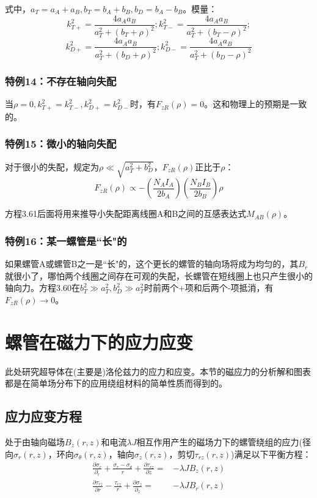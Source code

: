 式中，$a_T=a_A+a_B, b_T=b_A+b_B, b_D=b_A−b_B$。模量：
$$
k_{T+}^2=\frac{4a_Aa_B}{a_T^2+(b_T+\rho)^2}; k_{T-}^2=\frac{4a_Aa_B}{a_T^2+(b_T-\rho)^2};$$
$$k_{D+}^2=\frac{4a_Aa_B}{a_T^2+(b_D+\rho)^2};  k_{D-}^2=\frac{4a_Aa_B}{a_T^2+(b_D-\rho)^2}$$


\subsubsection{特例14：不存在轴向失配}
当$\rho=0, k_{T+}^2=k_{T-}^2, k_{D+}^2=k_{D-}^2$时，有$F_{zR}(\rho)=0$。这和物理上的预期是一致的。

\subsubsection{特例15：微小的轴向失配}
对于很小的失配，规定为$\rho\ll \sqrt{a_T^2+b_D^2}$，$F_{zR}(\rho)$正比于$\rho$：
\begin{equation}
F_{zR}(\rho)\propto-(\frac{N_AI_A}{2b_A})(\frac{N_BI_B}{2b_B})\rho
\end{equation}

方程3.61后面将用来推导小失配距离线圈A和B之间的互感表达式$M_{AB}(\rho)$。

\subsubsection{特例16：某一螺管是``长"的}
如果螺管A或螺管B之一是``长"的，这个更长的螺管的轴向场将成为均匀的，其$B_r$就很小了，哪怕两个线圈之间存在可观的失配，长螺管在短线圈上也只产生很小的轴向力。方程3.60在$b^2_T\gg a_T^2,b_D^2\gg a_T^2$时前两个+项和后两个-项抵消，有$F_{zR}(\rho)\rightarrow 0$。

\section{螺管在磁力下的应力应变}
此处研究超导体在(主要是)洛伦兹力的应力和应变。本节的磁应力的分析解和图表都是在简单场分布下的应用绕组材料的简单性质而得到的。

\subsection{应力应变方程}
处于由轴向磁场$B_z(r,z)$和电流$\lambda J$相互作用产生的磁场力下的螺管绕组的应力(径向$\sigma_r(r,z)$，环向$\sigma_\theta(r,z)$，轴向$\sigma_z(r,z)$，剪切$\tau_{rz}(r,z)$)满足以下平衡方程：
\begin{subequations}
	\begin{align}
\frac{\partial\sigma_{r}}{\partial_r}+\frac{\sigma_{r}-\sigma_{\theta}}{r}+\frac{\partial \tau_{rz}}{\partial z}=&-\lambda JB_z(r,z)\\
\frac{\partial \tau_{rz}}{\partial r}-\frac{\tau_{rz}}{r}+\frac{\partial \sigma_z}{\partial_z}=&-\lambda JB_r(r,z)
	\end{align}
\end{subequations}

